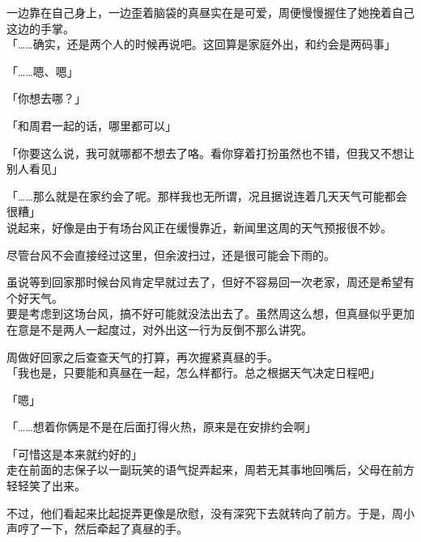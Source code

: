 一边靠在自己身上，一边歪着脑袋的真昼实在是可爱，周便慢慢握住了她挽着自己这边的手掌。\\

「……确实，还是两个人的时候再说吧。这回算是家庭外出，和约会是两码事」

「……嗯、嗯」

「你想去哪？」

「和周君一起的话，哪里都可以」

「你要这么说，我可就哪都不想去了咯。看你穿着打扮虽然也不错，但我又不想让别人看见」

「……那么就是在家约会了呢。那样我也无所谓，况且据说连着几天天气可能都会很糟」\\

说起来，好像是由于有场台风正在缓慢靠近，新闻里这周的天气预报很不妙。

尽管台风不会直接经过这里，但余波扫过，还是很可能会下雨的。

虽说等到回家那时候台风肯定早就过去了，但好不容易回一次老家，周还是希望有个好天气。\\

要是考虑到这场台风，搞不好可能就没法出去了。虽然周这么想，但真昼似乎更加在意是不是两人一起度过，对外出这一行为反倒不那么讲究。

周做好回家之后查查天气的打算，再次握紧真昼的手。\\

「我也是，只要能和真昼在一起，怎么样都行。总之根据天气决定日程吧」

「嗯」

「……想着你俩是不是在后面打得火热，原来是在安排约会啊」

「可惜这是本来就约好的」\\

走在前面的志保子以一副玩笑的语气捉弄起来，周若无其事地回嘴后，父母在前方轻轻笑了出来。

不过，他们看起来比起捉弄更像是欣慰，没有深究下去就转向了前方。于是，周小声哼了一下，然后牵起了真昼的手。

